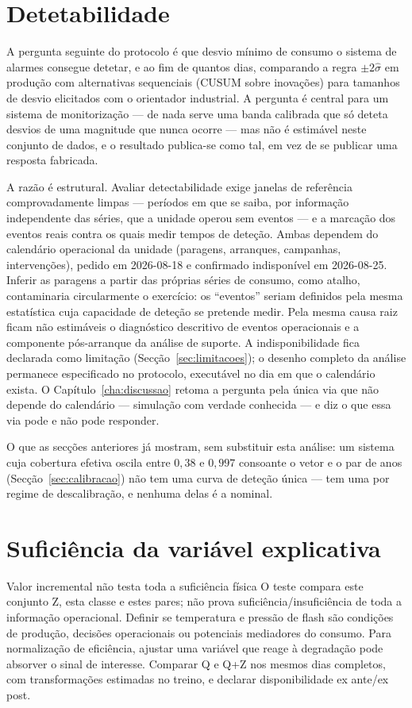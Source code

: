 \section{Detetabilidade}
\label{sec:detetabilidade}

A pergunta seguinte do protocolo é que desvio mínimo de consumo o sistema de alarmes
consegue detetar, e ao fim de quantos dias, comparando a regra
$\pm 2\hat\sigma$ em produção com alternativas sequenciais (CUSUM sobre
inovações) para tamanhos de desvio elicitados com o orientador industrial. A
pergunta é central para um sistema de monitorização --- de nada serve uma
banda calibrada que só deteta desvios de uma magnitude que nunca ocorre ---
mas não é estimável neste conjunto de dados, e o resultado publica-se como
tal, em vez de se publicar uma resposta fabricada.

A razão é estrutural. Avaliar detectabilidade exige janelas de referência
comprovadamente limpas --- períodos em que se saiba, por informação
independente das séries, que a unidade operou sem eventos --- e a marcação
dos eventos reais contra os quais medir tempos de deteção. Ambas dependem do
calendário operacional da unidade (paragens, arranques, campanhas,
intervenções), pedido em 2026-08-18 e confirmado indisponível em 2026-08-25.
Inferir as paragens a partir das próprias séries de consumo, como atalho,
contaminaria circularmente o exercício: os ``eventos'' seriam definidos pela
mesma estatística cuja capacidade de deteção se pretende medir. Pela mesma
causa raiz ficam não estimáveis o diagnóstico descritivo de eventos
operacionais e a componente pós-arranque da análise de suporte. A
indisponibilidade fica declarada como limitação
(Secção~\ref{sec:limitacoes}); o desenho completo da análise permanece
especificado no protocolo, executável no dia em que o calendário exista.
O Capítulo~\ref{cha:discussao} retoma a pergunta pela única via que não
depende do calendário --- simulação com verdade conhecida --- e diz o que
essa via pode e não pode responder.

O que as secções anteriores já mostram, sem substituir esta análise: um sistema cuja
cobertura efetiva oscila entre $0{,}38$ e $0{,}997$ consoante o vetor e o par
de anos (Secção~\ref{sec:calibracao}) não tem uma curva de deteção única
--- tem uma por regime de descalibração, e nenhuma delas é a nominal.


\section{Suficiência da variável explicativa}
\label{sec:suficiencia}
{Valor incremental não testa toda a suficiência física}
{O teste compara este conjunto Z, esta classe e estes pares; não prova
suficiência/insuficiência de toda a informação operacional. Definir se
temperatura e pressão de flash são condições de produção, decisões
operacionais ou potenciais mediadores do consumo. Para normalização de
eficiência, ajustar uma variável que reage à degradação pode absorver
o sinal de interesse. Comparar Q e Q+Z nos mesmos dias completos, com
transformações estimadas no treino, e declarar disponibilidade ex ante/ex post.}%

